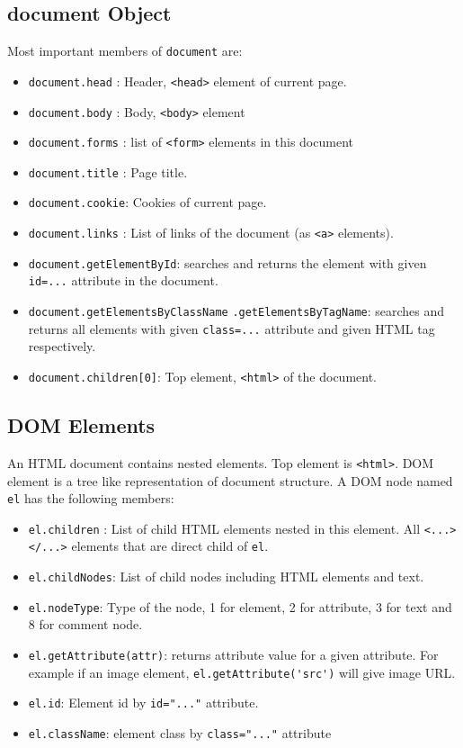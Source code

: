 \documentclass[trans,compress,xcolor=table]{beamer}
\begin{document}
\subsection*{document Object}
\begin{frame}[fragile]
Most important members of \lstinline!document! are:
\begin{itemize}
\item \lstinline!document.head! : Header, \lstinline!<head>! element
	of current page.
\item \lstinline!document.body! : Body, \lstinline!<body>! element
\item \lstinline!document.forms! : list of \lstinline!<form>! elements in this document
\item \lstinline!document.title! : Page title.
\item \lstinline!document.cookie!: Cookies of current page.
\item \lstinline!document.links! : List of links of the document (as \lstinline!<a>! elements).
\item \lstinline!document.getElementById!: searches and returns 
the element with given \lstinline!id=...! attribute in the document.
\item \lstinline!document.getElementsByClassName! 
\lstinline!.getElementsByTagName!: searches and returns all elements with given \lstinline!class=...! attribute and given HTML tag respectively.
\item
\lstinline!document.children[0]!: Top element, \lstinline!<html>! of the document.
\end{itemize}
\end{frame}

\subsection*{DOM Elements}
\begin{frame}[fragile]
An HTML document contains nested elements. Top element is
\lstinline!<html>!. DOM element is a tree like representation
of document structure.
A DOM node named \lstinline!el! has the following members:
\begin{itemize}
\item \lstinline!el.children! : List of child HTML elements
	nested in this element. All \lstinline!<...></...>! elements
	that are direct child of \lstinline!el!.
\item \lstinline!el.childNodes!: List of child nodes including
	HTML elements and text.
\item \lstinline!el.nodeType!: Type of the node, 1 for element, 2 for attribute, 3 for text and 8 for comment node.
\item \lstinline!el.getAttribute(attr)!: returns attribute value for a
	given attribute. For example if an image element, \lstinline!el.getAttribute('src')! will give image URL.
\item \lstinline!el.id!: Element id by \lstinline!id="..."! attribute.
\item \lstinline!el.className!: element class by \lstinline!class="..."! attribute
\end{itemize}
\end{frame}
\end{document}
